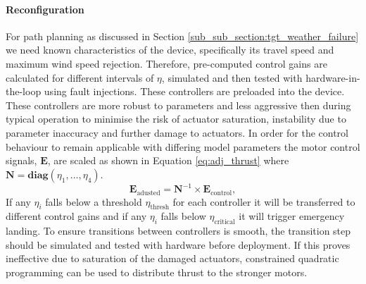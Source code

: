 \paragraph{Reconfiguration}
For path planning as discussed in Section \ref{sub_sub_section:tgt_weather_failure} we need known characteristics of the device, specifically its travel speed and maximum wind speed rejection. Therefore, pre-computed control gains are calculated for different intervals of $\eta$, simulated and then tested with hardware-in-the-loop using fault injections. These controllers are preloaded into the device. These controllers are more robust to parameters and less aggressive then during typical operation to minimise the risk of actuator saturation, instability due to parameter inaccuracy and further damage to actuators. In order for the control behaviour to remain applicable with differing model parameters the motor control signals, $\mathbf{E}$, are scaled as shown in Equation \ref{eq:adj_thrust} where $\mathbf{N} = \mathbf{diag}(\eta_1, \dots,\eta_4)$.
\begin{equation}\label{eq:adj_thrust}
    \mathbf{E}_{\text{adusted}} = \mathbf{N}^{-1}\times \mathbf{E}_{\text{control}}, 
\end{equation}
If any $\eta_i$ falls below a threshold $\eta_{\text{thresh}}$ for each controller it will be transferred to different control gains and if any $\eta_i$ falls below $\eta_{\text{critical}}$ it will trigger emergency landing. To ensure transitions between controllers is smooth, the transition step should be simulated and tested with hardware before deployment. If this proves ineffective due to saturation of the damaged actuators, constrained quadratic programming can be used \cite{JOHANSEN2013} to distribute thrust to the stronger motors.

